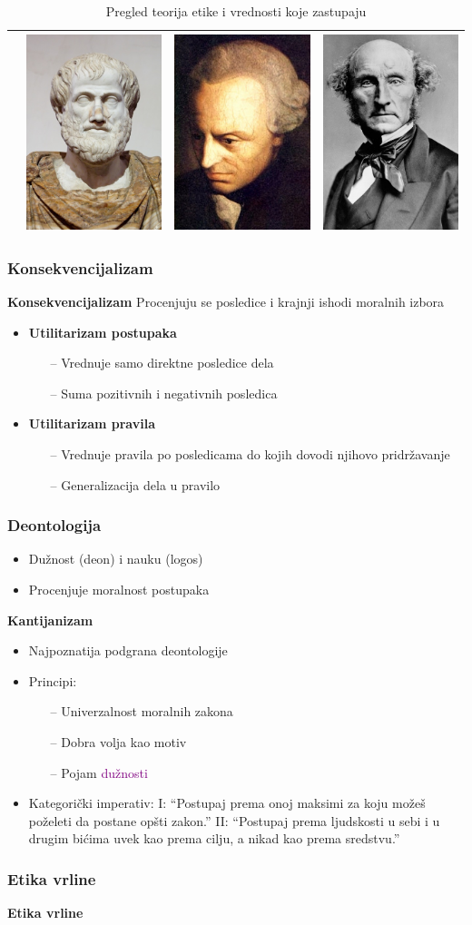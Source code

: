 \documentclass[pdf]{beamer}
\begin{document}
\begin{frame}
\begin{table}
\begin{center}
\begin{tabular}{|l|c|c|c|}
& \includegraphics[scale=.1]{slike/aristotel.jpg} & \includegraphics[scale=.1]{slike/kant.jpg} & \includegraphics[scale=.1]{slike/mil.jpg} \\
\hline
\end{tabular}
\label{tab:tabela1}
\caption{{Pregled teorija etike i vrednosti koje zastupaju}}
\end{center}
\end{table}

\end{frame}


\begin{frame}
\frametitle{Konsekvencijalizam}

\textbf{Konsekvencijalizam}\newline
Procenjuju se posledice i krajnji ishodi moralnih izbora
\begin{itemize}
\item{\textbf{Utilitarizam postupaka}}
	\begin{itemize}
	\item[--]{Vrednuje samo direktne posledice dela}
	\item[--]{Suma pozitivnih i negativnih posledica}
	\end{itemize}
\item{\textbf{Utilitarizam pravila}}
	\begin{itemize}
	\item[--]{Vrednuje pravila po posledicama do kojih dovodi njihovo pridržavanje}
	\item[--]{Generalizacija dela u pravilo}
	\end{itemize}
\end{itemize}


\end{frame}


\begin{frame}
\frametitle{Deontologija}

\begin{itemize}
\item{Dužnost (deon) i nauku (logos)}
\item{Procenjuje moralnost postupaka}
\end{itemize}
\textbf{Kantijanizam}
\begin{itemize}
\item{Najpoznatija podgrana deontologije}
\item{Principi:}
	\begin{itemize}
	\item[--]{Univerzalnost moralnih zakona}
	\item[--]{Dobra volja kao motiv}
	\item[--]{Pojam \textcolor{purple}{dužnosti}} 
	\end{itemize}
\item{Kategorički imperativ:\newline
I: ``Postupaj prema onoj maksimi za koju možeš poželeti da postane opšti zakon.''\newline
II: ``Postupaj prema ljudskosti u sebi i u drugim bićima uvek kao prema cilju, a nikad kao prema sredstvu.''}
\end{itemize} 
\end{frame}


\begin{frame}
\frametitle{Etika vrline}

\textbf{Etika vrline}
\begin{itemize}
\item{Pojmovi ključni za moralan život - edukacija, mudrost, društvene veze, uloga emo
\end{itemize}
\end{frame}
\end{document}
